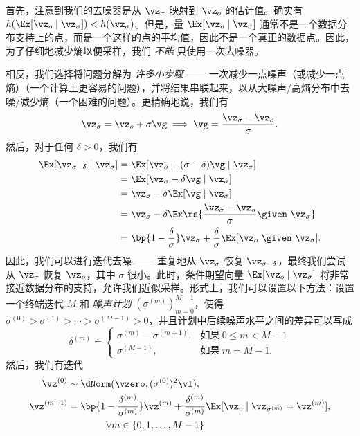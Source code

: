 \documentclass[../../book-main.tex]{subfiles}
\begin{document}
首先，注意到我们的去噪器是从 \(\vz_{\sigma}\) 映射到 \(\vz_{o}\) 的估计值。确实有 \(h(\Ex[\vz_{o} \mid \vz_{\sigma}]) < h(\vz_{\sigma})\)。但是，量 \(\Ex[\vz_{o} \mid \vz_{\sigma}]\) 通常不是一个数据分布支持上的点，而是一个这样的点的平均值，因此不是一个真正的数据点。因此，为了仔细地减少熵以便采样，我们 \textit{不能} 只使用一次去噪器。

相反，我们选择将问题分解为 \textit{许多小步骤} —— 一次减少一点噪声（或减少一点熵）（一个计算上更容易的问题），并将结果串联起来，以从大噪声/高熵分布中去噪/减少熵（一个困难的问题）。更精确地说，我们有
\begin{equation}
    \vz_{\sigma} = \vz_{o} + \sigma \vg \implies \vg = \frac{\vz_{\sigma} - \vz_{o}}{\sigma}.
\end{equation}
然后，对于任何 \(\delta > 0\)，我们有
\begin{align}
    \Ex[\vz_{\sigma - \delta} \mid \vz_{\sigma}]
    &= \Ex[\vz_{o} + (\sigma - \delta)\vg \mid \vz_{\sigma}] \\ 
    &= \Ex[\vz_{\sigma} - \delta \vg \mid \vz_{\sigma}] \\ 
    &= \vz_{\sigma} - \delta \Ex[\vg \mid \vz_{\sigma}] \\
    &= \vz_{\sigma} - \delta \Ex\rs{\frac{\vz_{\sigma} - \vz_{o}}{\sigma} \given\ \vz_{\sigma}} \\
    &= \bp{1 - \frac{\delta}{\sigma}}\vz_{\sigma} + \frac{\delta}{\sigma}\Ex[\vz_{o}\ \given\ \vz_{\sigma}].
\end{align}
因此，我们可以进行迭代去噪 —— 重复地从 \(\vz_{\sigma}\) 恢复 \(\vz_{\sigma - \delta}\)，最终我们尝试从 \(\vz_{\sigma}\) 恢复 \(\vz_{o}\)，其中 \(\sigma\) 很小。此时，条件期望向量 \(\Ex[\vz_{o} \mid \vz_{\sigma}]\) 将非常接近数据分布的支持，允许我们近似采样。形式上，我们可以设置以下方法：设置一个终端迭代 \(M\) 和 \textit{噪声计划} \((\sigma^{(m)})_{m = 0}^{M - 1}\)，使得 \(\sigma^{(0)} > \sigma^{(1)} > \cdots > \sigma^{(M - 1)} > 0\)，并且计划中后续噪声水平之间的差异可以写成
\begin{equation}
    \delta^{(m)} \doteq \begin{cases}\sigma^{(m)} - \sigma^{(m + 1)}, & \text{如果}\ 0 \leq m < M - 1 \\ \sigma^{(M - 1)}, & \text{如果}\ m = M - 1.\end{cases}
\end{equation}
然后，我们有迭代
\begin{align}
    \vz^{(0)} 
    &\sim \dNorm(\vzero, (\sigma^{(0)})^{2}\vI) \label{eq:denoising_ve_init}, \\ 
    \vz^{(m + 1)} 
    &= \bp{1 - \frac{\delta^{(m)}}{\sigma^{(m)}}}\vz^{(m)} + \frac{\delta^{(m)}}{\sigma^{(m)}}\Ex[\vz_{o} \mid \vz_{\sigma^{(m)}} = \vz^{(m)}], \label{eq:denoising_ve_iter} \\
    &\qquad  \qquad \forall m \in \{0, 1, \dots, M - 1\}
\end{align}
\end{document}
